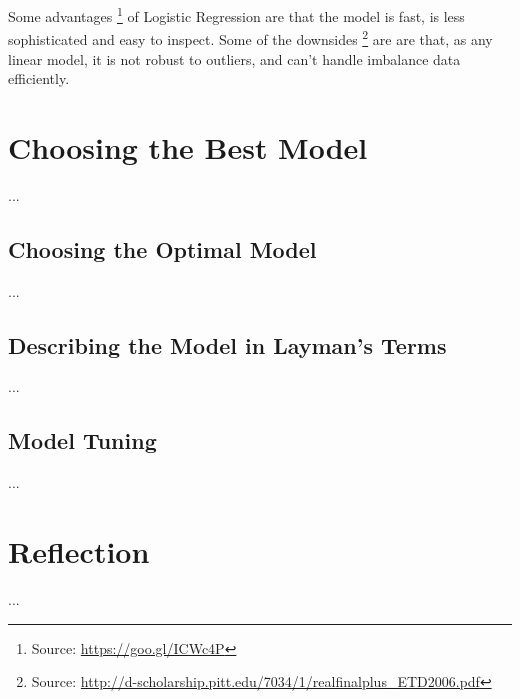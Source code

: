 \documentclass[a4paper]{article}
\begin{document}
Some advantages \footnote{Source: \url{https://goo.gl/ICWc4P}} of Logistic Regression are that the model is fast, is less sophisticated and easy to inspect. Some of the downsides \footnote{Source: \url{http://d-scholarship.pitt.edu/7034/1/realfinalplus_ETD2006.pdf}} are are that, as any linear model, it is not robust to outliers, and can't handle imbalance data efficiently.



\section{Choosing the Best Model}
...
\subsection{Choosing the Optimal Model}
...
\subsection{Describing the Model in Layman’s Terms}
...
\subsection{Model Tuning}
...




\section{Reflection}
...





\end{document}
